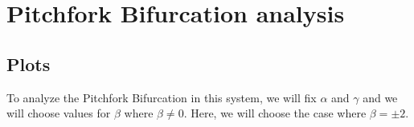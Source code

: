\section{Pitchfork Bifurcation analysis}\label{sec:pitchfork-bifurcation-analysis}

\subsection{Plots}\label{subsec:plots}
To analyze the Pitchfork Bifurcation in this system, we will fix $\alpha$ and $\gamma$ and we will choose values for $\beta$ where $\beta\neq0$. Here, we will choose the case where $\beta=\pm2$.
